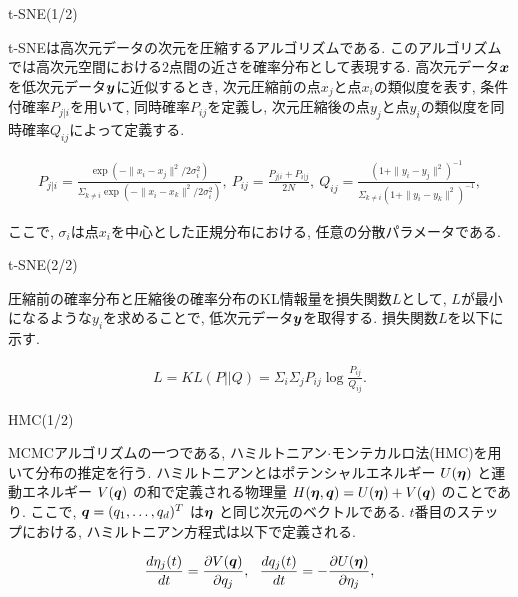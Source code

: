 \documentclass[dvipdfmx]{beamer} %
\newcommand{\bm}[1]{\mbox{\boldmath $#1$}}
\begin{document}
\begin{frame}{t-SNE(1/2)}

t-SNEは高次元データの次元を圧縮するアルゴリズムである. このアルゴリズムでは高次元空間における$2$点間の近さを確率分布として表現する. 高次元データ$\bm x$を低次元データ$\bm y$に近似するとき, 次元圧縮前の点$x_j$と点$x_i$の類似度を表す, 条件付確率$P_{j|i}$を用いて, 同時確率$P_{ij}$を定義し, 次元圧縮後の点$y_j$と点$y_i$の類似度を同時確率$Q_{ij}$によって定義する.

\footnotesize
\begin{eqnarray*}
\label{tsne1}
P_{j|i} = \frac{\exp(-\|x_i - x_j\|^2 / 2\sigma_i^2)}{\Sigma_{k \neq i}\exp(-\|x_i - x_k\|^2/ 2\sigma_i^2)},\ 
P_{ij} = \frac{P_{j|i} + P_{i|j}}{2N},\ 
Q_{ij} = \frac{(1 + \|y_i - y_j\|^2)^{-1}}{\Sigma_{k \neq i}(1 + \|y_i - y_k\|^2)^{-1}},
\end{eqnarray*}
\normalsize

\noindent
ここで, $\sigma_i$は点$x_i$を中心とした正規分布における, 任意の分散パラメータである.
\end{frame}

\begin{frame}{t-SNE(2/2)}

圧縮前の確率分布と圧縮後の確率分布のKL情報量を損失関数$L$として, $L$が最小になるような$y_i$を求めることで, 低次元データ$\bm y$を取得する. 損失関数$L$を以下に示す.

\begin{eqnarray*}
\label{tsne3}
L = KL(P || Q) = \Sigma_i \Sigma_j P_{ij} \log \frac{P_{ij}}{Q_{ij}}.
\end{eqnarray*}
\end{frame}

\begin{frame}{HMC(1/2)}

MCMCアルゴリズムの一つである, ハミルトニアン$\cdot$モンテカルロ法(HMC)を用いて分布の推定を行う. ハミルトニアンとはポテンシャルエネルギー $U(\bm \eta)$ と運動エネルギー $V(\bm q)$ の和で定義される物理量 $H(\bm \eta, \bm q) = U(\bm \eta) + V(\bm q)$ のことであり. ここで, $\bm q = (q_1, \dots, q_d)^T$ は$\bm \eta$ と同じ次元のベクトルである. $t$番目のステップにおける, ハミルトニアン方程式は以下で定義される. 

\begin{eqnarray*}
\label{HMC}
\frac{d \eta_j(t)}{dt} = \frac{\partial V(\bm q)}{\partial q_j},\ \ \frac{d q_j(t)}{dt} = - \frac{\partial U(\bm \eta)}{\partial \eta_j},
\end{eqnarray*}
\end{frame}
\end{document}
